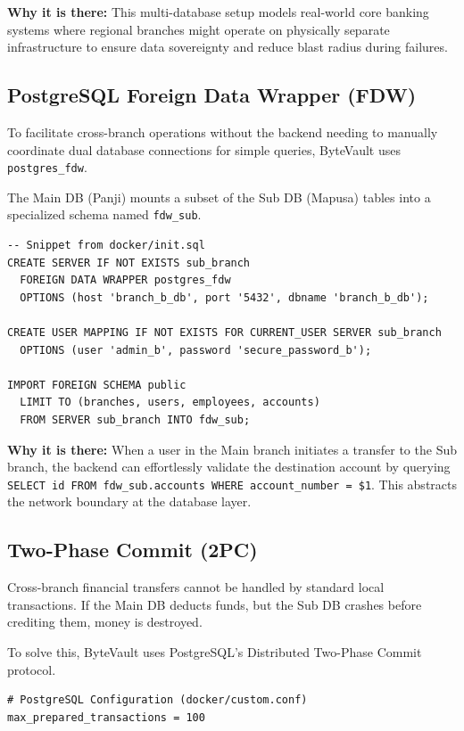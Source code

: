 \textbf{Why it is there:} This multi-database setup models real-world core banking systems where regional branches might operate on physically separate infrastructure to ensure data sovereignty and reduce blast radius during failures.

\subsection{PostgreSQL Foreign Data Wrapper (FDW)}
To facilitate cross-branch operations without the backend needing to manually coordinate dual database connections for simple queries, ByteVault uses \texttt{postgres\_fdw}. 

The Main DB (Panji) mounts a subset of the Sub DB (Mapusa) tables into a specialized schema named \texttt{fdw\_sub}.

\begin{lstlisting}[style=sql]
-- Snippet from docker/init.sql
CREATE SERVER IF NOT EXISTS sub_branch
  FOREIGN DATA WRAPPER postgres_fdw
  OPTIONS (host 'branch_b_db', port '5432', dbname 'branch_b_db');

CREATE USER MAPPING IF NOT EXISTS FOR CURRENT_USER SERVER sub_branch
  OPTIONS (user 'admin_b', password 'secure_password_b');

IMPORT FOREIGN SCHEMA public
  LIMIT TO (branches, users, employees, accounts)
  FROM SERVER sub_branch INTO fdw_sub;
\end{lstlisting}

\textbf{Why it is there:} When a user in the Main branch initiates a transfer to the Sub branch, the backend can effortlessly validate the destination account by querying \texttt{SELECT id FROM fdw\_sub.accounts WHERE account\_number = \$1}. This abstracts the network boundary at the database layer.

\subsection{Two-Phase Commit (2PC)}
Cross-branch financial transfers cannot be handled by standard local transactions. If the Main DB deducts funds, but the Sub DB crashes before crediting them, money is destroyed. 

To solve this, ByteVault uses PostgreSQL's Distributed Two-Phase Commit protocol.

\begin{lstlisting}[style=bash]
# PostgreSQL Configuration (docker/custom.conf)
max_prepared_transactions = 100
\end{lstlisting}

